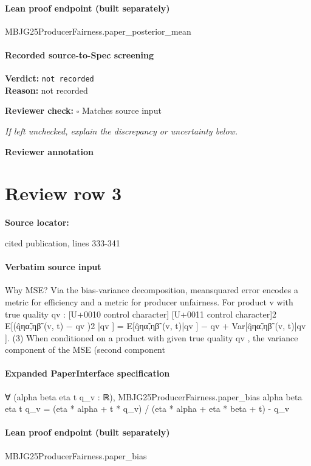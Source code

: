 \documentclass[10pt]{article}
\newcommand{\reviewerbox}{%
  \par\noindent\fbox{\parbox{0.96\linewidth}{\rule{0pt}{0.38in}}}\par
}
\newcommand{\reviewmatch}[1]{%
  \par\noindent\textbf{Reviewer check:} $\square$\; #1\par
  \noindent\emph{If left unchecked, explain the discrepancy or uncertainty below.}\par
}
\begin{document}
\paragraph{Lean proof endpoint (built separately)}\begin{ReviewVerbatim}
MBJG25ProducerFairness.paper_posterior_mean
\end{ReviewVerbatim}

\paragraph{Recorded source-to-Spec screening}
\textbf{Verdict:} \texttt{not recorded}
\\
\textbf{Reason:} not recorded
\reviewmatch{Matches source input}
\noindent\textbf{Reviewer annotation}\par
\reviewerbox
\clearpage
\hypertarget{source-claim-20150c21c10be6e2}{}
\section*{Review row 3}
\textbf{Source locator:} {\footnotesize\raggedright cited publication, lines 333-\allowbreak{}341\par}
\paragraph{Verbatim source input}
\begin{ReviewVerbatim}
Why MSE? Via the bias-variance decomposition, meansquared error encodes a metric for efficiency and a metric
for producer unfairness. For product v with true quality qv :
[U+0010 control character]
[U+0011 control character]2
E[(q̂ηα̃,ηβ̃ (v, t) − qv )2 |qv ] = E[q̂ηα̃,ηβ̃ (v, t)|qv ] − qv
+ Var[q̂ηα̃,ηβ̃ (v, t)|qv ].
(3)
When conditioned on a product with given true quality
qv , the variance component of the MSE (second component
\end{ReviewVerbatim}


\paragraph{Expanded PaperInterface specification}
\begin{ReviewVerbatim}
∀ (alpha beta eta t q_v : ℝ),
  MBJG25ProducerFairness.paper_bias alpha beta eta t q_v =
    (eta * alpha + t * q_v) / (eta * alpha + eta * beta + t) - q_v
\end{ReviewVerbatim}

\paragraph{Lean proof endpoint (built separately)}\begin{ReviewVerbatim}
MBJG25ProducerFairness.paper_bias
\end{ReviewVerbatim}
\end{document}
